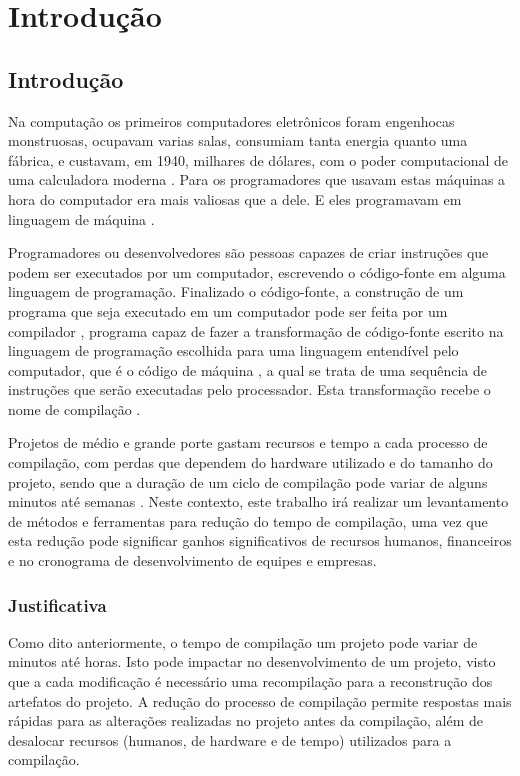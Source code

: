 \part{Introdução}

\chapter[Introdução]{Introdução}

Na computação os primeiros computadores eletrônicos foram engenhocas
 monstruosas, ocupavam varias salas, consumiam tanta energia quanto
 uma fábrica, e custavam, em 1940, milhares de dólares, com o poder
 computacional de uma calculadora moderna \cite{ref34}. Para os
 programadores que usavam estas máquinas a hora do computador era
 mais valiosas que a dele. E eles programavam em linguagem de
 máquina \cite{ref34}.

Programadores ou desenvolvedores são pessoas capazes de criar instruções
 que podem ser executados por um computador, escrevendo o código-fonte em
 alguma linguagem de programação. Finalizado o código-fonte, a construção
 de um programa que seja executado em um computador pode ser feita por um
 compilador \cite{ref5}, programa capaz de fazer a transformação de
 código-fonte escrito na linguagem de programação escolhida para uma linguagem
 entendível pelo computador, que é o código de máquina \cite{ref34}, a qual
 se trata de uma sequência de instruções que serão executadas  pelo
 processador. Esta transformação recebe o nome de compilação \cite{ref5}.

Projetos de médio e grande porte gastam recursos e tempo a cada processo
 de compilação, com perdas que dependem do hardware utilizado e do tamanho
 do projeto, sendo que a duração de um ciclo de compilação pode variar de
 alguns minutos até semanas \cite{ref52}. Neste contexto, este trabalho
 irá realizar um levantamento de métodos e ferramentas para redução do
 tempo de compilação, uma vez que esta redução pode significar ganhos
 significativos de recursos humanos, financeiros e no cronograma de
 desenvolvimento de equipes e empresas. 

\section{Justificativa}

Como dito anteriormente, o tempo de compilação um projeto pode variar
 de minutos até horas. Isto pode impactar no desenvolvimento de um
 projeto, visto que a cada modificação é necessário  uma recompilação
 para a reconstrução dos artefatos do projeto. A redução do processo
 de compilação permite respostas mais rápidas para as alterações
 realizadas no projeto antes da compilação, além de desalocar
 recursos (humanos, de hardware e de tempo) utilizados para
 a compilação.

